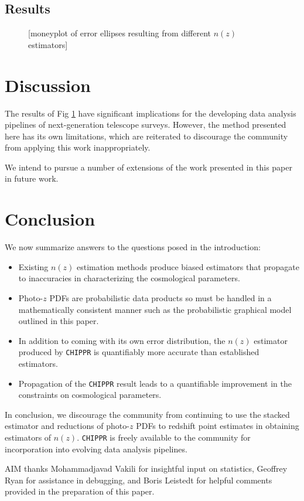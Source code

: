 \documentclass[iop]{emulateapj}
\newcommand{\chippr}{\texttt{CHIPPR} }
\begin{document}
\subsection{Results}
\label{sec:results}

\begin{figure}
	\begin{center}
		\caption{[moneyplot of error ellipses resulting from different 
$n(z)$ estimators]}
		\label{fig:money}
	\end{center}
\end{figure}

\section{Discussion}
\label{sec:discussion}

The results of Fig \ref{fig:money} have significant implications for the 
developing data analysis pipelines of next-generation telescope surveys.  
However, the method presented here has its own limitations, which are 
reiterated to discourage the community from applying this work inappropriately.

We intend to pursue a number of extensions of the work presented in this paper 
in future work.

\section{Conclusion}
\label{sec:conclusion}

We now summarize answers to the questions posed in the introduction:

\begin{itemize}
	\item Existing $n(z)$ estimation methods produce biased estimators that 
propagate to inaccuracies in characterizing the cosmological parameters.
	\item Photo-$z$ PDFs are probabilistic data products so must be handled 
in a mathematically consistent manner such as the probabilistic graphical model 
outlined in this paper.
	\item In addition to coming with its own error distribution, the $n(z)$ 
estimator produced by \chippr is quantifiably more accurate than established 
estimators.
	\item Propagation of the \chippr result leads to a quantifiable 
improvement in the constraints on cosmological parameters.
\end{itemize}

In conclusion, we discourage the community from continuing to use the stacked 
estimator and reductions of photo-$z$ PDFs to redshift point estimates in 
obtaining estimators of $n(z)$.  \chippr is freely available to the community 
for incorporation into evolving data analysis pipelines.  


\appendix{}

\begin{acknowledgements}
AIM thanks Mohammadjavad Vakili for insightful input on statistics, Geoffrey 
Ryan for assistance in debugging, and Boris Leistedt for helpful comments 
provided in the preparation of this paper.
\end{acknowledgements}
\end{document}
